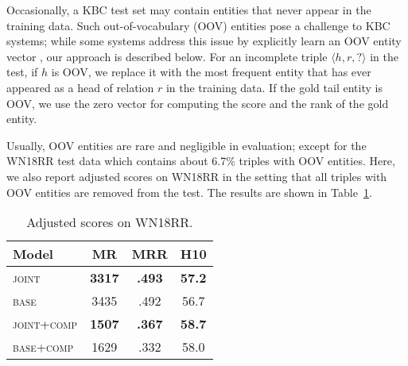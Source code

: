 \documentclass[11pt,a4paper]{article}
\renewcommand{\vec}[1]{\bm{#1}}
\newcommand{\mtriple}[3]{\langle #1, #2, #3 \rangle}
\begin{document}
Occasionally, a KBC test set may contain entities that never appear in the training data. Such 
out-of-vocabulary (OOV) entities pose a challenge to KBC systems; while some systems address 
this issue by explicitly learn an OOV entity vector \citep{dettmers2018conve}, our approach is described below. For an incomplete triple $\mtriple{h}{r}{?}$ in the test, if $h$ is OOV, 
we replace it with the most frequent entity that has ever appeared as a head of relation $r$ 
in the training data. If the gold tail entity is OOV, we use the zero vector for computing 
the score and the rank of the gold entity. 

Usually, OOV entities are rare and negligible in evaluation; except for the WN18RR test data 
which contains about 6.7\% triples with OOV entities. Here, we also report adjusted scores on WN18RR 
in the setting that all triples with OOV entities are removed from the test. The 
results are shown in Table~\ref{tab:wn18rr-remove-oov}.

\begin{table}[ht]
\centering
\small
\setlength{\tabcolsep}{13pt}
\begin{tabular}{lccc}
\toprule
Model & MR & MRR & H10 \\
\midrule
\textsc{joint} & \textbf{3317} & \textbf{.493} & \textbf{57.2} \\
\textsc{base} & 3435 & .492 & 56.7 \\
\midrule
\textsc{joint+comp} & \textbf{1507} & \textbf{.367} & \textbf{58.7} \\
\textsc{base+comp} & 1629 & .332 & 58.0 \\
\bottomrule
\end{tabular}
\caption{Adjusted scores on WN18RR.}
\label{tab:wn18rr-remove-oov}
\end{table}



\end{document}
